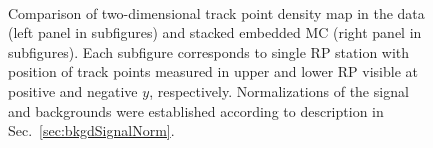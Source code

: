 \begin{figure}[h]
{\begin{subfigure}[b]{\linewidth}
  \end{subfigure}
}%
\quad\quad%
\parbox{0.4725\textwidth}{
  \centering
  \begin{subfigure}[b]{\linewidth}\addtocounter{subfigure}{-2}
  \end{subfigure}\\[10pt]
  \begin{subfigure}[b]{\linewidth}\addtocounter{subfigure}{1}
  \end{subfigure}
}%
\caption[Comparison of two-dimensional track point density map in the data and embedded MC.]
    {Comparison of two-dimensional track point density map in the data (left panel in subfigures) and stacked embedded MC (right panel in subfigures). Each subfigure corresponds to single RP station with position of track points measured in upper and lower RP visible at positive and negative $y$, respectively. Normalizations of the signal and backgrounds were established according to description in Sec.~\ref{sec:bkgdSignalNorm}.}\label{fig:hitMap_DataVsMC}%
\end{figure}



